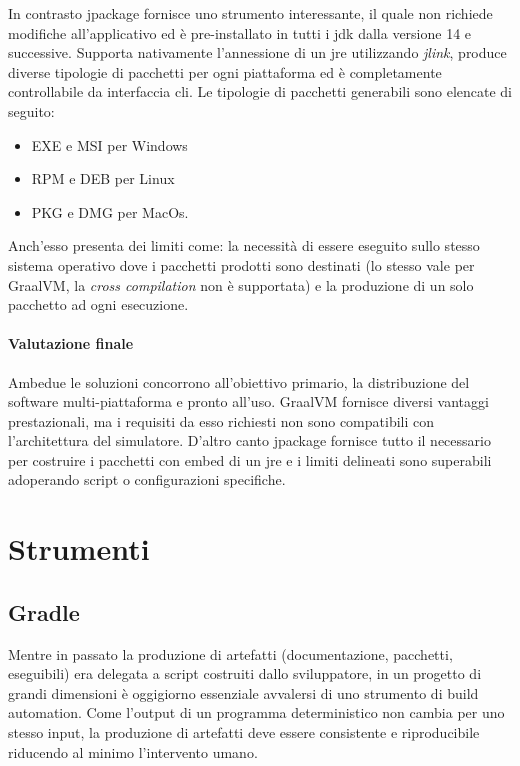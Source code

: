 In contrasto jpackage fornisce uno strumento interessante, il quale non richiede modifiche all'applicativo ed è pre-installato in tutti i \ac{jdk} dalla versione 14 e successive. Supporta nativamente l'annessione di un \ac{jre} utilizzando \textit{jlink}, produce diverse tipologie di pacchetti per ogni piattaforma ed è completamente controllabile da interfaccia \ac{cli}. Le tipologie di pacchetti generabili sono elencate di seguito:
\begin{itemize}
	\item EXE e MSI per Windows
	\item RPM e DEB per Linux
	\item PKG e DMG per MacOs.
\end{itemize}
Anch'esso presenta dei limiti come: la necessità di essere eseguito sullo stesso sistema operativo dove i pacchetti prodotti sono destinati (lo stesso vale per GraalVM, la \textit{cross compilation} non è supportata) e la produzione di un solo pacchetto ad ogni esecuzione.

\paragraph{Valutazione finale} Ambedue le soluzioni concorrono all'obiettivo primario, la distribuzione del software multi-piattaforma e pronto all'uso. GraalVM fornisce diversi vantaggi prestazionali, ma i requisiti da esso richiesti non sono compatibili con l'architettura del simulatore. D'altro canto jpackage fornisce tutto il necessario per costruire i pacchetti con embed di un \ac{jre} e i limiti delineati sono superabili adoperando script o configurazioni specifiche.

\section{Strumenti}

\subsection{Gradle}

Mentre in passato la produzione di artefatti (documentazione, pacchetti, eseguibili) era delegata a script costruiti dallo sviluppatore, in un progetto di grandi dimensioni è oggigiorno essenziale avvalersi di uno strumento di build automation. Come l'output di un programma deterministico non cambia per uno stesso input, la produzione di artefatti deve essere consistente e riproducibile riducendo al minimo l'intervento umano. 

